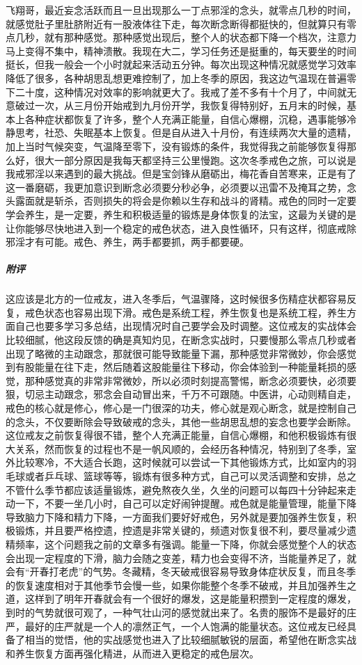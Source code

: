 \begin{case}
    飞翔哥，最近妄念活跃而且一旦出现那么一丁点邪淫的念头，就零点几秒的时间，就感觉肚子里肚脐附近有一股液体往下走，每次断念断得都挺快的，但就算只有零点几秒，就有那种感觉。那种感觉出现后，整个人的状态都下降一个档次，注意力马上变得不集中，精神溃散。我现在大二，学习任务还是挺重的，每天要坐的时间挺长，但我一般会一个小时就起来活动五分钟。每次出现这种情况就感觉学习效率降低了很多，各种胡思乱想更难控制了，加上冬季的原因，我这边气温现在普遍零下二十度，这种情况对效率的影响就更大了。我戒了差不多有十个月了，中间就无意破过一次，从三月份开始戒到九月份开学，我恢复得特别好，五月末的时候，基本上各种症状都恢复了许多，整个人充满正能量，自信心爆棚，沉稳，遇事能够冷静思考，社恐、失眠基本上恢复。但是自从进入十月份，有连续两次大量的遗精，加上当时气候突变，气温降至零下，没有锻炼的条件，我觉得我之前能够恢复得那么好，很大一部分原因是我每天都坚持三公里慢跑。这次冬季戒色之旅，可以说是我戒邪淫以来遇到的最大挑战。但是宝剑锋从磨砺出，梅花香自苦寒来，正是有了这一番磨砺，我更加意识到断念必须要分秒必争，必须要以迅雷不及掩耳之势，念头露面就是斩杀，否则损失的将会是你赖以生存和战斗的肾精。戒色的同时一定要学会养生，是一定要，养生和积极适量的锻炼是身体恢复的法宝，这最为关键的是让你能够尽快地进入到一个稳定的戒色状态，进入良性循环，只有这样，彻底戒除邪淫才有可能。戒色、养生，两手都要抓，两手都要硬。
    \subparagraph{附评} 这应该是北方的一位戒友，进入冬季后，气温骤降，这时候很多伤精症状都容易反复，戒色状态也容易出现下滑。戒色是系统工程，养生恢复也是系统工程，养生方面自己也要多学习多总结，出现情况时自己要学会及时调整。这位戒友的实战体会比较细腻，他这段反馈的确是真知灼见，在断念实战时，只要慢那么零点几秒或者出现了略微的主动跟念，那就很可能导致能量下漏，那种感觉非常微妙，你会感觉到有股能量在往下走，然后随着这股能量往下移动，你会体验到一种能量耗损的感觉，那种感觉真的非常非常微妙，所以必须时刻提高警惕，断念必须要快，必须要狠，切忌主动跟念，邪念会自动冒出来，千万不可跟随。中医讲，心动则精自走，戒色的核心就是修心，修心是一门很深的功夫，修心就是观心断念，就是控制自己的念头，不仅要断除会导致破戒的念头，其他一些胡思乱想的妄念也要学会断除。这位戒友之前恢复得很不错，整个人充满正能量，自信心爆棚，和他积极锻炼有很大关系，然而恢复的过程也不是一帆风顺的，会经历各种情况，特别到了冬季，室外比较寒冷，不大适合长跑，这时候就可以尝试一下其他锻炼方式，比如室内的羽毛球或者乒乓球、篮球等等，锻炼有很多种方式，自己可以灵活调整和安排，总之不管什么季节都应该适量锻炼，避免熬夜久坐，久坐的问题可以每四十分钟起来走动一下，不要一坐几小时，自己可以定好闹钟提醒。戒色就是能量管理，能量下降导致脑力下降和精力下降，一方面我们要好好戒色，另外就是要加强养生恢复，积极锻炼，并且要严格控遗，控遗是非常关键的，频遗对恢复很不利，要尽量减少遗精频率，这个问题我之前的文章多有强调。能量一下降，你就会感觉整个人的状态会出现一定程度的下滑，脑力会随之变差，精力也会变得不济，当能量养足了，就会有“开春打老虎”的气势。冬藏精，冬天破戒很容易导致身体症状反复，而且冬季的恢复速度相对于其他季节会慢一些，如果你能整个冬季不破戒，并且加强养生之道，这样到了明年开春就会有一个很好的爆发，这是能量积攒到一定程度的爆发，到时的气势就很可观了，一种气壮山河的感觉就出来了。名贵的服饰不是最好的庄严，最好的庄严就是一个人的凛然正气，一个人饱满的能量状态。这位戒友已经具备了相当的觉悟，他的实战感觉也进入了比较细腻敏锐的层面，希望他在断念实战和养生恢复方面再强化精进，从而进入更稳定的戒色层次。
\end{case}

